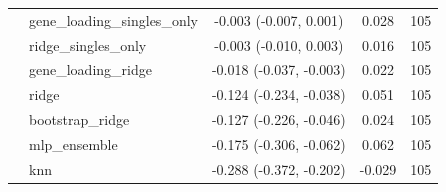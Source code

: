 \begin{tabular}{llccr}
 & gene\_loading\_singles\_only & -0.003 (-0.007, 0.001) & 0.028 & 105 \\
 & ridge\_singles\_only & -0.003 (-0.010, 0.003) & 0.016 & 105 \\
 & gene\_loading\_ridge & -0.018 (-0.037, -0.003) & 0.022 & 105 \\
 & ridge & -0.124 (-0.234, -0.038) & 0.051 & 105 \\
 & bootstrap\_ridge & -0.127 (-0.226, -0.046) & 0.024 & 105 \\
 & mlp\_ensemble & -0.175 (-0.306, -0.062) & 0.062 & 105 \\
 & knn & -0.288 (-0.372, -0.202) & -0.029 & 105 \\
\bottomrule
\end{tabular}